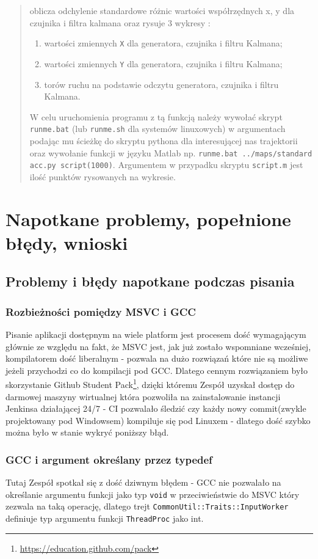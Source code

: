 \documentclass{article}
\begin{document}
\begin{enumerate}
\begin{verse}
		oblicza odchylenie standardowe różnic wartości współrzędnych
		x, y dla czujnika i filtra kalmana oraz rysuje 3 wykresy : 
		\begin{enumerate}
			\item wartości zmiennych \texttt{X} dla generatora, czujnika i filtru Kalmana;
			\item wartości zmiennych \texttt{Y} dla generatora, czujnika i filtru Kalmana;
			\item torów ruchu na podstawie odczytu generatora, czujnika i filtru Kalmana.
		\end{enumerate}
		W celu uruchomienia programu z tą funkcją należy wywołać skrypt \texttt{runme.bat} (lub \texttt{runme.sh} dla systemów linuxowych) w argumentach podając mu ścieżkę do skryptu pythona dla interesującej nas trajektorii oraz wywołanie funkcji w języku Matlab np. \texttt{runme.bat ../maps/standard acc.py script(1000)}. Argumentem w przypadku skryptu \texttt{script.m} jest ilość punktów rysowanych na wykresie.
		\end{verse}
	\end{enumerate}
	
	\section{Napotkane problemy, popełnione błędy, wnioski}
	
	\subsection{Problemy i błędy napotkane podczas pisania}
	\subsubsection{Rozbieżności pomiędzy MSVC i GCC}
	Pisanie aplikacji dostępnym na wiele platform jest procesem dość wymagającym głównie ze względu na fakt, że MSVC jest, jak już zostało wspomniane wcześniej, kompilatorem dość liberalnym - pozwala na dużo rozwiązań które nie są możliwe jeżeli przychodzi co do kompilacji pod GCC. Dlatego cennym rozwiązaniem było skorzystanie Github Student Pack\footnote{\url{https://education.github.com/pack}}, dzięki któremu Zespół uzyskał dostęp do darmowej maszyny wirtualnej która pozwoliła na zainstalowanie instancji Jenkinsa działającej 24/7 - CI pozwalało śledzić czy każdy nowy commit(zwykle projektowany pod Windowsem) kompiluje się pod Linuxem - dlatego dość szybko można było w stanie wykryć poniższy błąd.
	\subsubsection{GCC i argument określany przez typedef}
	Tutaj Zespół spotkał się z dość dziwnym błędem - GCC nie pozwalało na określanie argumentu funkcji jako typ \texttt{void} w przeciwieństwie do MSVC  który zezwala na taką operację, dlatego trejt \texttt{CommonUtil::Traits::InputWorker} definiuje typ argumentu funkcji \texttt{ThreadProc} jako int.
\end{document}

